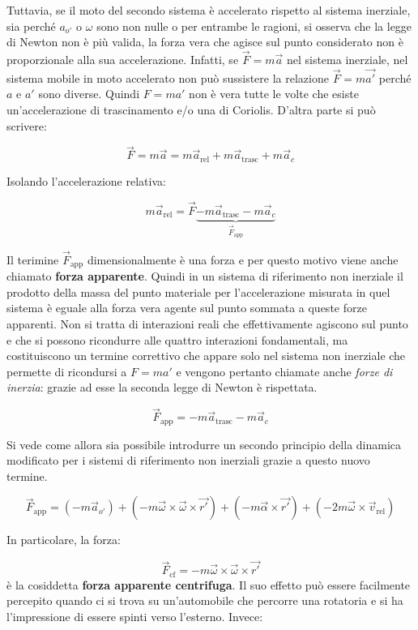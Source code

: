 Tuttavia, se il moto del secondo sistema è accelerato rispetto al sistema inerziale, sia perché $a_{o'}$ o $\omega$ sono non nulle o per entrambe le ragioni, si osserva che la legge di Newton non è più valida, la forza vera che agisce sul punto considerato non è proporzionale alla sua accelerazione. Infatti, se $\vec{F}=m\vec{a}$ nel sistema inerziale, nel sistema mobile in moto accelerato non può sussistere la relazione $\vec{F}=m\vec{a'}$ perché $a$ e $a'$ sono diverse.
Quindi $F=ma'$ non è vera tutte le volte che esiste un'accelerazione di trascinamento e/o una di Coriolis. D'altra parte si può scrivere:

\[
	\vec{F}=m\vec{a}=m\vec{a}_{\text{rel}}+m\vec{a}_{\text{trasc}}+m\vec{a}_c
\]

Isolando l'accelerazione relativa:

\[
	m\vec{a}_{\text{rel}}=\vec{F} \underbrace{-m\vec{a}_{\text{trasc}}-m\vec{a}_c}_{\vec{F}_{\text{app}}}
\]

Il terimine $\vec{F}_{\text{app}}$ dimensionalmente è una forza e per questo motivo viene anche chiamato \textbf{forza apparente}. Quindi in un sistema di riferimento non inerziale il prodotto della massa del punto materiale per l'accelerazione misurata in quel sistema è eguale alla forza vera agente sul punto sommata a queste forze apparenti. Non si tratta di interazioni reali che effettivamente agiscono sul punto e che si possono ricondurre alle quattro interazioni fondamentali, ma costituiscono un termine correttivo che appare solo nel sistema non inerziale che permette di ricondursi a $F=ma'$ e vengono pertanto chiamate anche \textit{forze di inerzia}: grazie ad esse la seconda legge di Newton è rispettata.

\[
	\vec{F}_{\text{app}}=-m\vec{a}_{\text{trasc}}-m\vec{a}_c
\]

Si vede come allora sia possibile introdurre un secondo principio della dinamica modificato per i sistemi di riferimento non inerziali grazie a questo nuovo termine.

\[
	\vec{F}_{\text{app}}=(-m\vec{a}_{o'})+(-m\vec{\omega}\times \vec{\omega} \times \vec{r'})+(-m\vec{\alpha}\times\vec{r'})+(-2m\vec{\omega} \times \vec{v}_{\text{rel}})
\]

In particolare, la forza:

\[
	\vec{F}_{\text{cf}}=-m\vec{\omega}\times \vec{\omega} \times \vec{r'}
\]
è la cosiddetta \textbf{forza apparente centrifuga}. Il suo effetto può essere facilmente percepito quando ci si trova su un'automobile che percorre una rotatoria e si ha l'impressione di essere spinti verso l'esterno. Invece:

